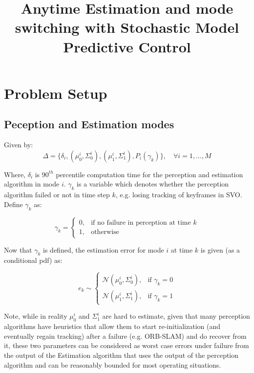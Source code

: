 \documentclass{article}[14pt]
\title{Anytime Estimation and mode switching with Stochastic Model Predictive Control}
\begin{document}
\maketitle

\section{Problem Setup}

\subsection{Peception and Estimation modes}
Given by:
\begin{equation}
\Delta = \{\delta_i, (\mu^i_0, \Sigma^i_0), (\mu^i_1, \Sigma^i_1), P_i(\gamma_k)\}, \quad \forall i = 1,\dotsc, M \nonumber
\label{eq:modes}
\end{equation}

Where, $\delta_i$ is $90^{th}$ percentile computation time for the perception and estimation algorithm in mode $i$. $\gamma_k$ is a variable which denotes whether the perception algorithm failed or not in time step $k$, e.g. losing tracking of keyframes in SVO. Define $\gamma_k$ as:

\begin{equation}
    \gamma_k  = 
\begin{cases}
    0,& \text{if no failure in perception at time $k$}\\
    1,              & \text{otherwise}
\end{cases}
\end{equation}

Now that $\gamma_k$ is defined, the estimation error for mode $i$ at time $k$ is given (as a conditional pdf) as:

 \begin{equation}
    e_k  \sim
\begin{cases}
    \mathcal{N}(\mu^i_0,\Sigma^i_0) ,& \text{if } \gamma_k = 0\\
    \mathcal{N}(\mu^i_1,\Sigma^i_1), & \text{if } \gamma_k = 1
\end{cases}
\label{eq:ek_pdf_cond}
\end{equation}

Note, while in reality $\mu^i_0$ and $\Sigma^i_1$ are hard to estimate, given that many perception algorithms have heuristics that allow them to start re-initialization (and eventually regain tracking) after a failure (e.g. ORB-SLAM) and do recover from it, these two parameters can be considered as worst case errors under failure from the output of the Estimation algorithm that uses the output of the perception algorithm and can be reasonably bounded for most operating situations.
\end{document}
